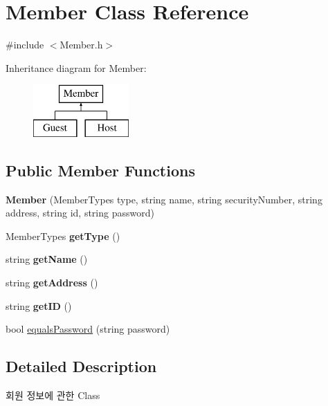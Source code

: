 \hypertarget{class_member}{}\section{Member Class Reference}
\label{class_member}


{\ttfamily \#include $<$Member.\+h$>$}

Inheritance diagram for Member\+:\begin{figure}[H]
\begin{center}
\leavevmode
\includegraphics[height=2.000000cm]{class_member}
\end{center}
\end{figure}
\subsection*{Public Member Functions}
\begin{DoxyCompactItemize}
\item 
\mbox{\label{class_member_af48adfcb614a6e5501237dc93e07ab2c}} 
{\bfseries Member} (Member\+Types type, string name, string security\+Number, string address, string id, string password)
\item 
\mbox{\label{class_member_accf776380b3a2f391b4f57e1d938a071}} 
Member\+Types {\bfseries get\+Type} ()
\item 
\mbox{\label{class_member_acbe6a0cd073a21fb0f1da2cbfb260952}} 
string {\bfseries get\+Name} ()
\item 
\mbox{\label{class_member_a737850218112eb82ae1d81789c1244e1}} 
string {\bfseries get\+Address} ()
\item 
\mbox{\label{class_member_ae486cfbc7e5ab2fc5705115c4f96b2c2}} 
string {\bfseries get\+ID} ()
\item 
bool \mbox{\hyperlink{class_member_a9fe3103fb15b00e6a51194d57f6c4148}{equals\+Password}} (string password)
\end{DoxyCompactItemize}


\subsection{Detailed Description}
회원 정보에 관한 Class 

